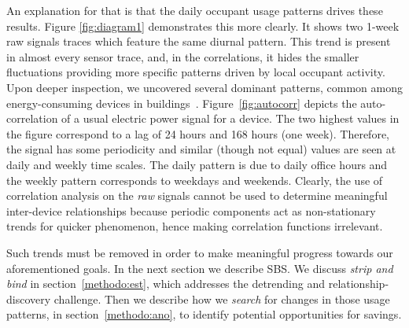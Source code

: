 An explanation for that is that the daily occupant usage patterns %
drives these results.
Figure \ref{fig:diagram1} demonstrates this more clearly.  It shows two 1-week raw signals traces which feature the same 
diurnal pattern.  
This trend is present in almost every sensor trace, and, in the correlations, it hides 
the smaller fluctuations providing more specific patterns driven by local occupant activity.  Upon deeper inspection, we uncovered several
 dominant patterns, common among energy-consuming devices in buildings~\cite{wrinch:pes2012}.  Figure~\ref{fig:autocorr} depicts the 
 auto-correlation of a usual electric power signal for a device.  The two highest values in the figure correspond to a lag of 24 hours and 168 hours (one week).  
 Therefore, the signal has some periodicity and similar (though not equal) values are seen at daily and weekly time scales.
The daily pattern is due to daily office hours and the weekly pattern corresponds to weekdays and weekends.  
Clearly, the use of correlation analysis on the \emph{raw} signals cannot be used to determine meaningful 
inter-device relationships because periodic components act as non-stationary trends for quicker phenomenon, hence making correlation functions irrelevant.  %

Such trends must be removed in order to make meaningful progress towards our aforementioned goals.  In the next section
we describe SBS.  We discuss \emph{strip and bind} in section~\ref{methodo:est}, which addresses the detrending and
relationship-discovery challenge.  Then we describe how we \emph{search} for changes in those usage patterns, 
in section~\ref{methodo:ano}, to identify potential opportunities for savings.

